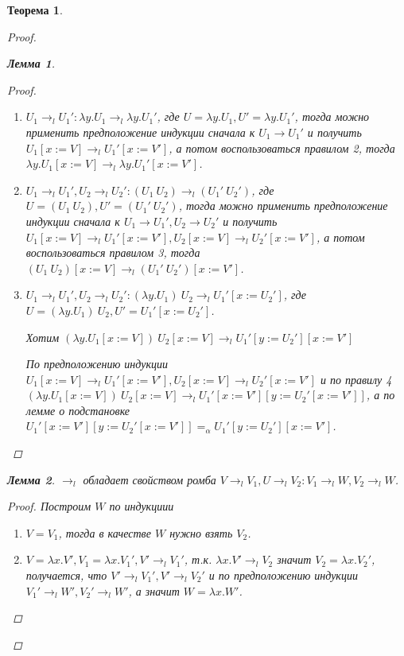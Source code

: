 \documentclass[10pt,twoside]{article}
\theoremstyle{plain}
\newtheorem{thm}{Теорема}
\newtheorem{lemma}{Лемма}
\theoremstyle{definition}
\begin{document}
\begin{thm}
\begin{proof}
\begin{lemma}
\begin{proof}
\begin{enumerate}
          \item $U_1\to_l U_1':\lambda y.U_1\to_l\lambda y.U_1'$, где $U=\lambda y.U_1, U'=\lambda y.U_1'$, тогда можно применить предположение индукции сначала к $U_1\to U_1'$ и получить $U_1[x:=V]\to_l U_1'[x:=V']$, а потом воспользоваться правилом 2, тогда $\lambda y.U_1[x:=V]\to_l \lambda y.U_1'[x:=V']$.

          \item $U_1\to_l U_1',U_2\to_l U_2':(U_1\ U_2)\to_l (U_1'\ U_2')$, где $U=(U_1\ U_2), U'=(U_1'\ U_2')$, тогда можно применить предположение индукции сначала к $U_1\to U_1',U_2\to U_2'$ и получить $U_1[x:=V]\to_l U_1'[x:=V'],U_2[x:=V]\to_l U_2'[x:=V']$, а потом воспользоваться правилом 3, тогда $(U_1\ U_2)[x:=V]\to_l (U_1'\ U_2')[x:=V']$.

          \item $U_1\to_l U_1',U_2\to_l U_2':(\lambda y.U_1)\ U_2\to_l U_1'[x:=U_2']$, где $U=(\lambda y.U_1)\ U_2, U'=U_1'[x:=U_2']$.

          Хотим $(\lambda y.U_1[x:=V])\ U_2[x:=V]\to_l U_1'[y:=U_2'][x:=V']$

          По предположению индукции $U_1[x:=V]\to_l U_1'[x:=V'], U_2[x:=V]\to_l U_2'[x:=V']$ и по правилу 4 $(\lambda y.U_1[x:=V])\ U_2[x:=V]\to_l U_1'[x:=V'][y:=U_2'[x:=V']]$, а по лемме о подстановке $U_1'[x:=V'][y:=U_2'[x:=V']] =_\alpha U_1'[y:=U_2'][x:=V']$.
        \end{enumerate}
      \end{proof}
    \end{lemma}
    \begin{lemma}
      $\to_l$ обладает свойством ромба $V\to_l V_1,U\to_l V_2:V_1\to_l W, V_2\to_l W$.

      \begin{center}
      \end{center}
      \begin{proof}
        Построим $W$ по индукциии
        \begin{enumerate}
          \item $V=V_1$, тогда в качестве $W$ нужно взять $V_2$.

            \begin{center}
            \end{center}
          \item $V=\lambda x.V',V_1=\lambda x.V_1', V'\to_l V_1'$, т.к. $\lambda x.V'\to_l V_2$ значит $V_2=\lambda x.V_2'$, получается, что $V'\to_l V_1',V'\to_l V_2'$ и по предположению индукции $V_1'\to_l W', V_2'\to_l W'$, а значит $W=\lambda x.W'$.


\end{enumerate}
\end{proof}
\end{lemma}
\end{proof}
\end{thm}
\end{document}
